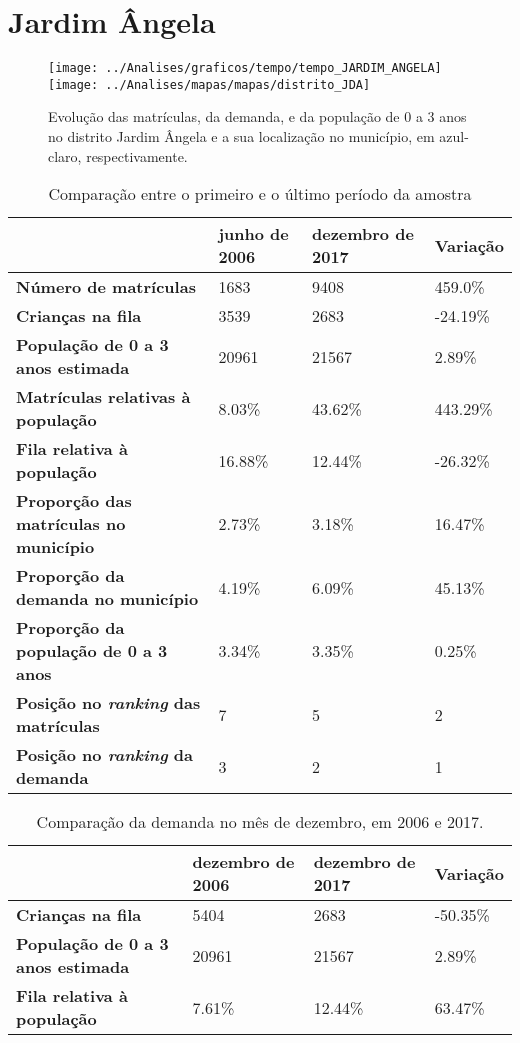 \section{Jardim Ângela}
\begin{figure}[H]
\centering
\texttt{[image: ../Analises/graficos/tempo/tempo\_JARDIM\_ANGELA]}
\texttt{[image: ../Analises/mapas/mapas/distrito\_JDA]}
\caption{Evolução das matrículas, da demanda, e da população de 0 a 3 anos no distrito Jardim Ângela e a sua localização no município, em azul-claro, respectivamente.}
\end{figure}
\begin{table}[H]
\begin{tabular}{l|l|l|l}
\textbf{}                                      & \textbf{junho de 2006}       & \textbf{dezembro de 2017}    & \textbf{Variação} \\ \hline
\textbf{Número de matrículas}                  & 1683 & 9408 & 459.0\% \\ \hline
\textbf{Crianças na fila}                      & 3539 & 2683 & -24.19\% \\ \hline
\textbf{População de 0 a 3 anos estimada}      & 20961 & 21567 & 2.89\% \\ \hline
\textbf{Matrículas relativas à população}      & 8.03\% & 43.62\% & 443.29\% \\ \hline
\textbf{Fila relativa à população}             & 16.88\% & 12.44\% & -26.32\% \\ \hline
\textbf{Proporção das matrículas no município} & 2.73\% & 3.18\% & 16.47\% \\ \hline
\textbf{Proporção da demanda no município}     & 4.19\% & 6.09\% & 45.13\% \\ \hline
\textbf{Proporção da população de 0 a 3 anos}  & 3.34\% & 3.35\% & 0.25\% \\ \hline
\textbf{Posição no \textit{ranking} das matrículas}     & 7 & 5 & 2 \\ \hline
\textbf{Posição no \textit{ranking} da demanda}         & 3 & 2 & 1 \\ 
\end{tabular}
\caption{Comparação entre o primeiro e o último período da amostra}
\end{table}
\begin{table}[H]
\begin{tabular}{l|l|l|l}
\textbf{}                                 & \textbf{dezembro de 2006} & \textbf{dezembro de 2017} & \textbf{Variação} \\ \hline
\textbf{Crianças na fila}                      & 5404 & 2683 & -50.35\% \\ \hline
\textbf{População de 0 a 3 anos estimada}      & 20961 & 21567 & 2.89\% \\ \hline
\textbf{Fila relativa à população}             & 7.61\% & 12.44\% & 63.47\% \\
\end{tabular}
\caption{Comparação da demanda no mês de dezembro, em 2006 e 2017.}
\end{table}
